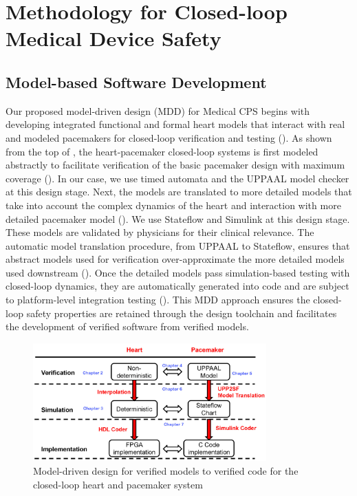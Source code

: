 \section{Methodology for Closed-loop Medical Device Safety}

\subsection{Model-based Software Development}
Our proposed model-driven design (MDD) for Medical CPS begins with developing integrated functional and formal heart models that interact with real and modeled pacemakers for closed-loop verification and testing (\cite{VHM_proc}). As shown from the top of , the heart-pacemaker closed-loop systems is first modeled abstractly to facilitate verification of the basic pacemaker design with maximum coverage (\cite{STTT13}). In our case, we use timed automata and the UPPAAL model checker at this design stage. Next, the models are translated to more detailed models that take into account the complex dynamics of the heart and interaction with more detailed pacemaker model (\cite{vhm_ecrts10, vhm_embc11,vhm_iccps11}). We use Stateflow and Simulink at this design stage. These models are validated by physicians for their clinical relevance. The automatic model translation procedure, from UPPAAL to Stateflow, ensures that abstract models used for verification over-approximate the more detailed models used downstream (\cite{RTAS12}). Once the detailed models pass simulation-based testing with closed-loop dynamics, they are automatically generated into code and are subject to platform-level integration testing (\cite{vhm_website}). This MDD approach ensures the closed-loop safety properties are retained through the design toolchain and facilitates the development of verified software from verified models.
\begin{figure}[t]
		\centering
		\includegraphics[width=0.8\textwidth]{figs/modeling_overview.jpg}
		\caption{\small Model-driven design for verified models to verified code for the closed-loop heart and pacemaker system}
		\label{fig:modeling_overview}
\end{figure}
